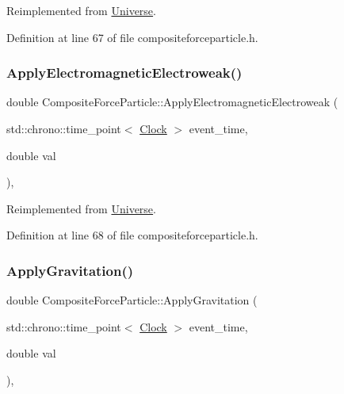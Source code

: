 Reimplemented from \hyperlink{class_universe_a1f787da78fa196ba635db21a9e91dabb}{Universe}.



Definition at line 67 of file compositeforceparticle.\+h.

\mbox{\label{class_composite_force_particle_a5f6aef9e15e2e5f346c7ede76ae6458b}} 
\subsubsection{\texorpdfstring{Apply\+Electromagnetic\+Electroweak()}{ApplyElectromagneticElectroweak()}}
{\footnotesize\ttfamily double Composite\+Force\+Particle\+::\+Apply\+Electromagnetic\+Electroweak (\begin{DoxyParamCaption}\item[{std\+::chrono\+::time\+\_\+point$<$ \hyperlink{universe_8h_a0ef8d951d1ca5ab3cfaf7ab4c7a6fd80}{Clock} $>$}]{event\+\_\+time,  }\item[{double}]{val }\end{DoxyParamCaption})\hspace{0.3cm}{\ttfamily [inline]}, {\ttfamily [virtual]}}



Reimplemented from \hyperlink{class_universe_a4c36c1ab30db993307f88363dde5e8c5}{Universe}.



Definition at line 68 of file compositeforceparticle.\+h.

\mbox{\label{class_composite_force_particle_ae26a03c2970a3825e8583a811339b28d}} 
\subsubsection{\texorpdfstring{Apply\+Gravitation()}{ApplyGravitation()}}
{\footnotesize\ttfamily double Composite\+Force\+Particle\+::\+Apply\+Gravitation (\begin{DoxyParamCaption}\item[{std\+::chrono\+::time\+\_\+point$<$ \hyperlink{universe_8h_a0ef8d951d1ca5ab3cfaf7ab4c7a6fd80}{Clock} $>$}]{event\+\_\+time,  }\item[{double}]{val }\end{DoxyParamCaption})\hspace{0.3cm}{\ttfamily [inline]}, {\ttfamily [virtual]}}



